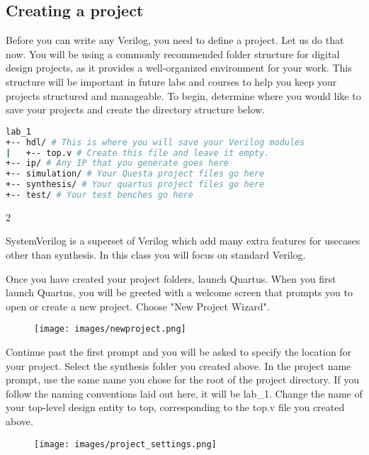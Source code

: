 \documentclass[12pt]{journal}
\begin{document}
\subsection{Creating a project}
Before you can write any Verilog, you need to define a project. Let us do that now. You will be using a commonly recommended folder structure for digital design projects, as it provides a well-organized environment for your work. This structure will be important in future labs and courses to help you keep your projects structured and manageable. To begin, determine where you would like to save your projects and create the directory structure below.
\clearpage
\begin{lstlisting}[style=console,language=sh]
lab_1
+-- hdl/ # This is where you will save your Verilog modules
|   +-- top.v # Create this file and leave it empty.
+-- ip/ # Any IP that you generate goes here
+-- simulation/ # Your Questa project files go here
+-- synthesis/ # Your quartus project files go here
+-- test/ # Your test benches go here
\end{lstlisting}
\vspace{4em}
\begin{paracol} {2}   
\switchcolumn[1]
\begin{extra}[frametitle={Verilog and System Verilog}]
    SystemVerilog is a superset of Verilog which add many extra features for usecases other than synthesis. In this class you will focus on standard Verilog.
\end{extra}
\switchcolumn[0]
Once you have created your project folders, launch Quartus. When you first launch Quartus, you will be greeted with a welcome screen that prompts you to open or create a new project. Choose "New Project Wizard".
\begin{figure}[H]
    \centering
    \texttt{[image: images/newproject.png]}
\end{figure}
\end{paracol}


Continue past the first prompt and you will be asked to specify the location for your project. Select the synthesis folder you created above. In the project name prompt, use the same name you chose for the root of the project directory. If you follow the naming conventions laid out here, it will be lab\_1. Change the name of your top-level design entity to top, corresponding to the top.v file you created above.

\begin{figure}[H]
    \centering
    \texttt{[image: images/project\_settings.png]}
\end{figure}
\end{document}

